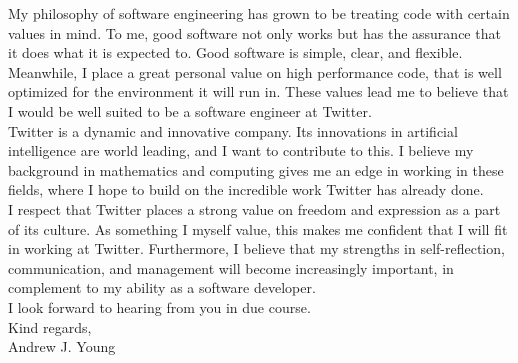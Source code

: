 \documentclass{article}
\begin{document}
My philosophy of software engineering has grown to be treating code with
certain values in mind. To me, good software not only works but has the
assurance that it does what it is expected to. Good software is simple, clear,
and flexible.  Meanwhile, I place a great personal value on high performance
code, that is well optimized for the environment it will run in. These values
lead me to believe that I would be well suited to be a software engineer at
Twitter.\\

Twitter is a dynamic and innovative company. Its innovations in artificial
intelligence are world leading, and I want to contribute to this.  I believe my
background in mathematics and computing gives me an edge in working in these
fields, where I hope to build on the incredible work Twitter has already done.\\

I respect that Twitter places a strong value on freedom and expression
as a part of its culture. As something I myself value, this makes me confident
that I will fit in working at Twitter. Furthermore, I believe that my strengths
in self-reflection, communication, and management will become increasingly
important, in complement to my ability as a software developer.\\

I look forward to hearing from you in due course.\\

Kind regards,\\

Andrew J. Young\\
\end{document}

